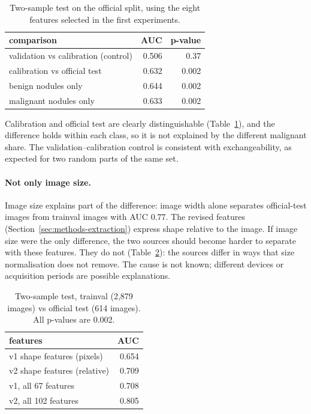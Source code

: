 \begin{table}[ht]
  \centering
  \caption{Two-sample test on the official split, using the eight features selected in the
           first experiments.}
  \label{tab:data-twosample-official}
  \begin{tabular}{lrr}
    \toprule
    comparison & AUC & p-value \\
    \midrule
    validation vs calibration (control) & 0.506 & 0.37 \\
    calibration vs official test        & 0.632 & 0.002 \\
    \quad benign nodules only           & 0.644 & 0.002 \\
    \quad malignant nodules only        & 0.633 & 0.002 \\
    \bottomrule
  \end{tabular}
\end{table}

Calibration and official test are clearly distinguishable
(Table~\ref{tab:data-twosample-official}), and the difference holds within each class, so it is
not explained by the different malignant share. The validation--calibration control is
consistent with exchangeability, as expected for two random parts of the same set.

\paragraph{Not only image size.} Image size explains part of the difference: image width alone
separates official-test images from trainval images with AUC 0.77. The revised features
(Section~\ref{sec:methods-extraction}) express shape relative to the image. If image size were
the only difference, the two sources should become harder to separate with these features. They
do not (Table~\ref{tab:data-sources}): the sources differ in ways that size normalisation does
not remove. The cause is not known; different devices or acquisition periods are possible
explanations.

\begin{table}[ht]
  \centering
  \caption{Two-sample test, trainval (2,879 images) vs official test (614 images). All p-values
           are 0.002.}
  \label{tab:data-sources}
  \begin{tabular}{lr}
    \toprule
    features & AUC \\
    \midrule
    v1 shape features (pixels)   & 0.654 \\
    v2 shape features (relative) & 0.709 \\
    v1, all 67 features          & 0.708 \\
    v2, all 102 features         & 0.805 \\
    \bottomrule
  \end{tabular}
\end{table}

